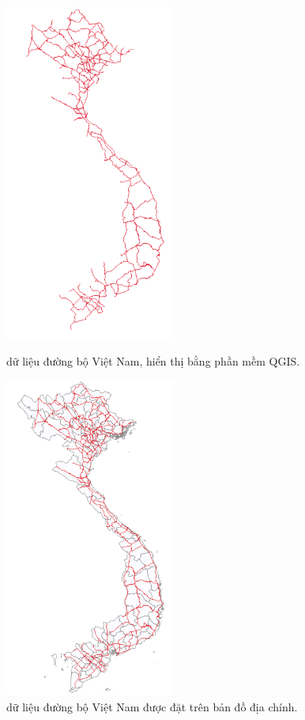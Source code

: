 \documentclass[14pt, oneside, a4paper, openany]{scrartcl}
\begin{document}
\begin{figure}
	\centering
	\begin{minipage}{0.6\textwidth}
		\centering
		\includegraphics[width=0.5\textwidth]{figures/vietnamroad.png} %
		\caption[dữ liệu đường bộ Việt Nam]{dữ liệu đường bộ Việt Nam, hiển thị bằng phần mềm QGIS.}
		\label{fig:vnhighway01}
	\end{minipage}\hfill
	\begin{minipage}{0.6\textwidth}
		\centering
		\includegraphics[width=0.5\textwidth]{figures/vietnamroad03.png} %
		\caption[dữ liệu đường bộ Việt Nam được đặt trên bản đồ địa chính]{dữ liệu đường bộ Việt Nam được đặt trên bản đồ địa chính.}
		\label{fig:vnhighway02}
	\end{minipage}
\end{figure}
\end{document}
